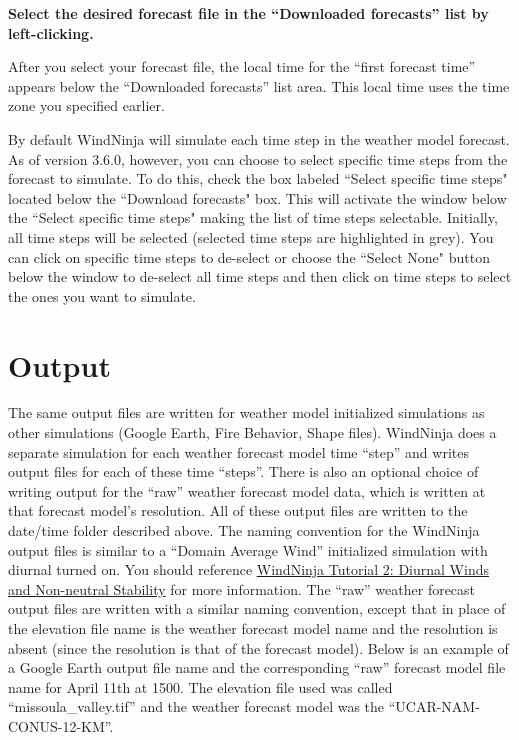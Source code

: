 \documentclass[12pt]{article}
\begin{document}
\textbf{\color{red}Select the desired forecast file in the “Downloaded forecasts” list by left-clicking.}

After you select your forecast file, the local time for the “first forecast time” appears below the “Downloaded forecasts” list area.  
This local time uses the time zone you specified earlier.

By default WindNinja will simulate each time step in the weather model forecast. 
As of version 3.6.0, however, you can choose to select specific time steps from the forecast to simulate. 
To do this, check the box labeled “Select specific time steps" located below the “Download forecasts" box. 
This will activate the window below the “Select specific time steps" making the list of time steps selectable. 
Initially, all time steps will be selected (selected time steps are highlighted in grey). 
You can click on specific time steps to de-select or choose the “Select None" button below the window to de-select all time steps and then click on time steps to select the ones you want to simulate.

\section{Output}

The same output files are written for weather model initialized simulations as other simulations (Google Earth, Fire Behavior, Shape files).  
WindNinja does a separate simulation for each weather forecast model time “step” and writes output files for each of these time “steps”.  
There is also an optional choice of writing output for the “raw” weather forecast model data, which is written at that forecast model's resolution.  
All of these output files are written to the date/time folder described above.  
The naming convention for the WindNinja output files is similar to a “Domain Average Wind” initialized simulation with diurnal turned on.  
You should reference \href{https://weather.firelab.org/windninja/tutorials/WindNinja_tutorial2.pdf}{WindNinja Tutorial 2: Diurnal Winds and Non-neutral Stability} for more information.  
The “raw” weather forecast output files are written with a similar naming convention, except that in place of the elevation file name is the weather forecast model name and the resolution is absent (since the resolution is that of the forecast model).  
Below is an example of a Google Earth output file name and the corresponding “raw” forecast model file name for April 11th at 1500.  
The elevation file used was called “missoula\_valley.tif” and the weather forecast model was the “UCAR-NAM-CONUS-12-KM”.
\end{document}

